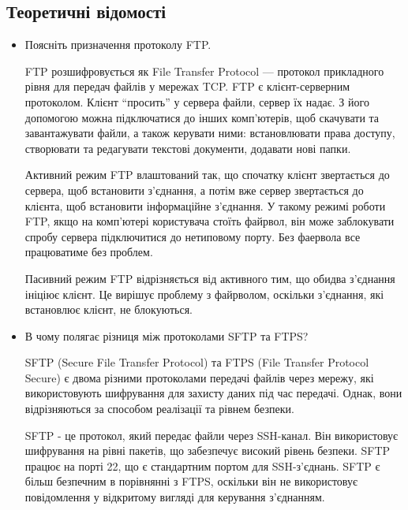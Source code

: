 \documentclass{article}
\begin{document}
\begin{normalsize}
\section*{Теоретичні відомості}
\begin{itemize}
	\item Поясніть призначення протоколу FTP.
	
	FTP розшифровується як File Transfer Protocol — протокол  прикладного рівня для передач файлів у мережах TCP. FTP є клієнт-серверним протоколом. Клієнт “просить” у сервера файли, сервер їх надає. З його допомогою можна підключатися до інших комп’ютерів, щоб скачувати та завантажувати файли, а також керувати ними: встановлювати права доступу, створювати та редагувати текстові документи, додавати нові папки.
	
	Активний режим FTP влаштований так, що спочатку клієнт звертається до сервера, щоб встановити з’єднання, а потім вже сервер звертається до клієнта, щоб встановити інформаційне з’єднання. У такому режимі роботи FTP, якщо на комп’ютері користувача стоїть файрвол, він може заблокувати спробу сервера підключитися до нетиповому порту. Без фаервола все працюватиме без проблем.
	
	Пасивний режим FTP відрізняється від активного тим, що обидва з’єднання ініціює клієнт. Це вирішує проблему з файрволом, оскільки з’єднання, які встановлює клієнт, не блокуються.
	
	\item В чому полягає різниця між протоколами SFTP та FTPS?
	
	SFTP (Secure File Transfer Protocol) та FTPS (File Transfer Protocol Secure) є двома різними протоколами передачі файлів через мережу, які використовують шифрування для захисту даних під час передачі. Однак, вони відрізняються за способом реалізації та рівнем безпеки.
	
	SFTP - це протокол, який передає файли через SSH-канал. Він використовує шифрування на рівні пакетів, що забезпечує високий рівень безпеки. SFTP працює на порті 22, що є стандартним портом для SSH-з'єднань. SFTP є більш безпечним в порівнянні з FTPS, оскільки він не використовує повідомлення у відкритому вигляді для керування з'єднанням.
	

\end{itemize}
\end{normalsize}
\end{document}
